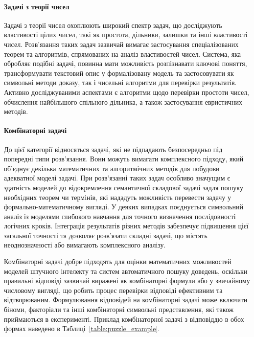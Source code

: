 \paragraph{Задачі з теорії чисел}
Задачі з теорії чисел охоплюють широкий спектр задач, що досліджують властивості цілих чисел, такі як простота, дільники, залишки та інші властивості чисел. Розв'язання таких задач зазвичай вимагає застосування спеціалізованих теорем та алгоритмів, спрямованих на аналіз властивостей чисел. Система, яка обробляє подібні задачі, повинна мати можливість розпізнавати ключові поняття, трансформувати текстовий опис у формалізовану модель та застосовувати як символьні методи доказу, так і чисельні алгоритми для перевірки результатів. Активно досліджуваними аспектами є алгоритми щодо перевірки простоти чисел, обчислення найбільшого спільного дільника, а також застосування евристичних методів.

\paragraph{Комбінаторні задачі}
До цієї категорії відносяться задачі, які не підпадають безпосередньо під попередні типи розв'язання. Вони можуть вимагати комплексного підходу, який об'єднує декілька математичних та алгоритмічних методів для побудови адекватної моделі задачі. При розв'язанні таких задач особливо значущим є здатність моделей до відокремлення семантичної складової задачі задля пошуку необхідних теорем чи термінів, які нададуть можливість перевести задачу у формально-математичному вигляді. У деяких випадках поєднується символьний аналіз із моделями глибокого навчання для точного визначення послідовності логічних кроків. Інтеграція результатів різних методів забезпечує підвищення цієї загальної точності та дозволяє розв'язати складні задачі, що містять неоднозначності або вимагають комплексного аналізу.

Комбінаторні задачі добре підходять для оцінки математичних можливостей моделей штучного інтелекту та систем автоматичного пошуку доведень, оскільки правильні відповіді зазвичай виражені як комбінаторні формули або у звичайному числовому вигляді, що робить процес перевірки відповіді ефективним та відтворюваним. Формулювання відповідей на комбінаторні задачі може включати біноми, факторіали та інші комбінаторні символьні представлення, які також приймаються в експерименті. Приклад комбінаторної задачі з відповіддю в обох формах наведено в Таблиці~\ref{table:puzzle_example}.

